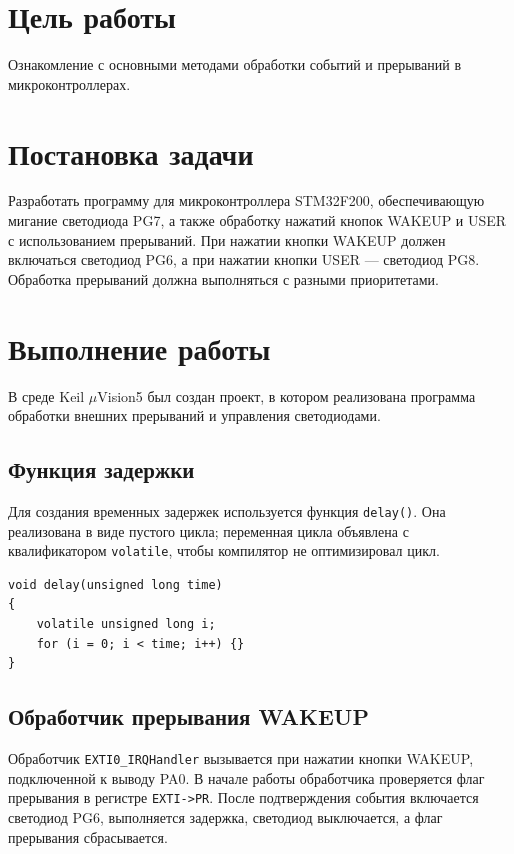 \section{Цель работы}

Ознакомление с основными методами обработки событий и прерываний в микроконтроллерах.

\section{Постановка задачи}

Разработать программу для микроконтроллера STM32F200, обеспечивающую мигание светодиода PG7, а также обработку нажатий кнопок WAKEUP и USER с использованием прерываний.
При нажатии кнопки WAKEUP должен включаться светодиод PG6, а при нажатии кнопки USER --- светодиод PG8.
Обработка прерываний должна выполняться с разными приоритетами.

\section{Выполнение работы}

В среде Keil $\mu$Vision5 был создан проект, в котором реализована программа обработки внешних прерываний и управления светодиодами.

\subsection{Функция задержки}

Для создания временных задержек используется функция \verb|delay()|. Она реализована в виде пустого цикла; переменная цикла объявлена с квалификатором \verb|volatile|, чтобы компилятор не оптимизировал цикл.

\begin{listing}[H]
\caption{Функция задержки}
\begin{verbatim}
void delay(unsigned long time)
{
    volatile unsigned long i;
    for (i = 0; i < time; i++) {}
}
\end{verbatim}
\end{listing}

\subsection{Обработчик прерывания WAKEUP}

Обработчик \verb|EXTI0_IRQHandler| вызывается при нажатии кнопки WAKEUP, подключенной к выводу PA0.
В начале работы обработчика проверяется флаг прерывания в регистре \verb|EXTI->PR|.
После подтверждения события включается светодиод PG6, выполняется задержка, светодиод выключается, а флаг прерывания сбрасывается.

